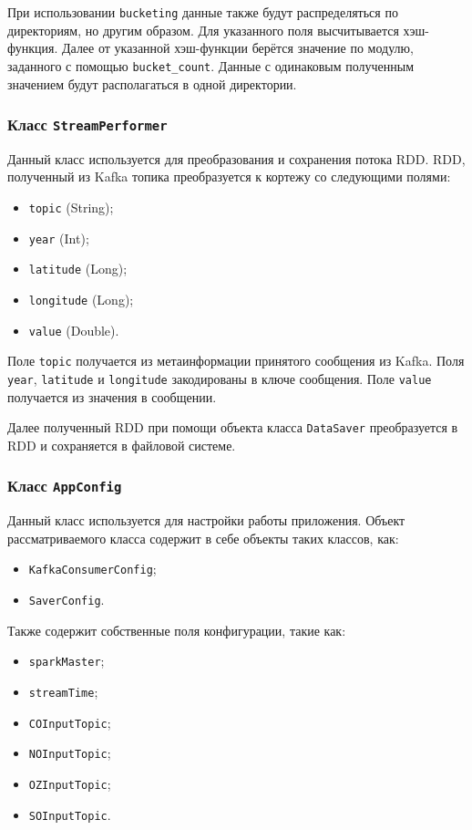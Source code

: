 При использовании \texttt{bucketing} данные также будут распределяться по директориям, но другим образом.
Для указанного поля высчитывается хэш-функция.
Далее от указанной хэш-функции берётся значение по модулю, заданного с помощью \texttt{bucket\_count}.
Данные с одинаковым полученным значением будут располагаться в одной директории.

\subsubsection{Класс \texttt{StreamPerformer}}

Данный класс используется для преобразования и сохранения потока RDD.
RDD, полученный из Kafka топика преобразуется к кортежу со следующими полями:

\begin{itemize}
    \item \texttt{topic} (String);
    \item \texttt{year} (Int);
    \item \texttt{latitude} (Long);
    \item \texttt{longitude} (Long);
    \item \texttt{value} (Double).
\end{itemize}

Поле \texttt{topic} получается из метаинформации принятого сообщения из Kafka.
Поля \texttt{year}, \texttt{latitude} и \texttt{longitude} закодированы в ключе сообщения.
Поле \texttt{value} получается из значения в сообщении.

Далее полученный RDD при помощи объекта класса \texttt{DataSaver} преобразуется в RDD и сохраняется в файловой системе.

\subsubsection{Класс \texttt{AppConfig}}
Данный класс используется для настройки работы приложения.
Объект рассматриваемого класса содержит в себе объекты таких классов, как:
\begin{itemize}
    \item \texttt{KafkaConsumerConfig};
    \item \texttt{SaverConfig}.
\end{itemize}

Также содержит собственные поля конфигурации, такие как:
\begin{itemize}
    \item \texttt{sparkMaster};
    \item \texttt{streamTime};
    \item \texttt{COInputTopic};
    \item \texttt{NOInputTopic};
    \item \texttt{OZInputTopic};
    \item \texttt{SOInputTopic}.
\end{itemize}

